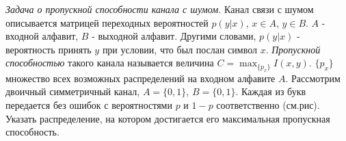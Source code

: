 \begin{comment}


\begin{remark} Идея о типичных последовательностях лежит в основе кодирования. Например, $\delta$-типичные $n$-буквенные слова кодируются при помощи двоичных последовательностей длины $n(H(X) + \delta)$, нетипичные отбрасываются или представляются одним и тем же добавочным символом. Очевидно, что при декодировании (восстановлении) вероятность ошибки не превысит $\epsilon$.
\end{remark}

\begin{problem} Рассмотрите связь между доказательством принципа асимптотической равнораспределенности и эквивалентностью (для больших систем)энтропий Больцмана и Гиббса.
\end{problem}


\end{comment}


\begin{problem} \textit{Задача о пропускной способности канала с шумом.} Канал связи с шумом описывается матрицей переходных вероятностей $p(y|x)$, $x \in A$, $y \in B$. $A$ - входной алфавит, $B$ - выходной алфавит. Другими словами, $p(y|x)$ - вероятность принять $y$ при условии, что был послан символ $x$. \textit{Пропускной способностью} такого канала называется величина $C = \max_{\{p_x\}} I(x, y)$. $\{p_x\}$ множество всех возможных распределений на входном алфавите $A$.
Рассмотрим двоичный симметричный канал, $A =\{0, 1\}$, $B =\{0, 1\}$. Каждая из букв передается без ошибок с вероятностями $p$ и $1-p$ соответственно (см.рис). Указать распределение, на котором достигается его максимальная пропускная способность.
\end{problem}

